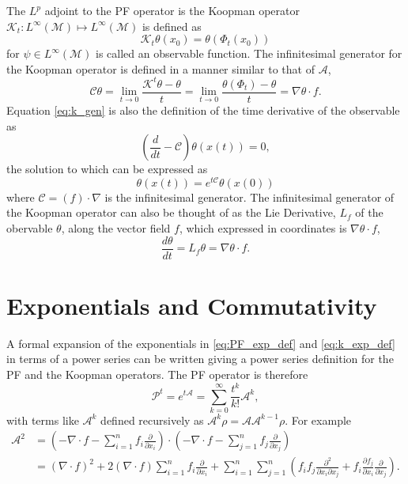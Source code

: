 \documentclass[pdflatex,sn-mathphys]{sn-jnl}%
\newcommand{\C}{\mathcal{C}}
\theoremstyle{thmstyleone}%
\theoremstyle{thmstyletwo}%
\theoremstyle{thmstylethree}%
\begin{document}
The $L^p$ adjoint to the PF operator is the Koopman operator   $\mathcal{K}_t : L^{\infty}(\mathcal{M}) \mapsto L^{\infty}(\mathcal{M})$ is defined as 
\begin{equation} \label{eq:koopman}
    \mathcal{K}_t \theta(x_0) = \theta(\Phi_t(x_0))
\end{equation}
for $\psi \in L^{\infty}(\mathcal{M})$ is called an observable function.
The infinitesimal generator for the Koopman operator is defined in a manner similar to that of $\mathcal{A}$,
\begin{equation}\label{eq:k_gen}
    \mathcal{C} \theta = \lim_{t \to 0}\frac{\mathcal{K}^t\theta - \theta}{t} = \lim_{t \to 0}\frac{\theta(\Phi_t)-\theta}{t} = \nabla \theta \cdot f.
\end{equation} 
Equation \eqref{eq:k_gen} is also the definition of the time derivative of the observable as
\begin{equation}\label{eq:k_pde}
\left(\frac{d}{dt} -\mathcal{C} \right) \theta(x(t)) = 0,
\end{equation}
the solution to which can be expressed as 
\begin{equation}\label{eq:k_exp_def}
    \theta(x(t)) = e^{t\mathcal{C}}\theta(x(0))
\end{equation}
where $\C = (f)\cdot\nabla$ is the infinitesimal generator. The infinitesimal generator of the Koopman operator can also be thought of as the Lie Derivative, $L_f$ of the obervable $\theta$, along the vector field $f$, which expressed in coordinates is $\nabla \theta \cdot f$,
\[
\frac{d \theta}{d t} = L_f \theta = \nabla \theta \cdot f.
\]


\section{Exponentials and Commutativity} \label{sec:exponentials}
A formal expansion of the exponentials in \eqref{eq:PF_exp_def} and \eqref{eq:k_exp_def} in terms of a power series  can be written giving  a power series definition for the PF and the Koopman operators. The PF operator is therefore
\begin{equation}\label{eq:Pf-exp}
\mathcal{P}^t = e^{t\mathcal{A}}= \sum_{k=0}^{\infty} \frac{t^k}{k!}\mathcal{A}^k,
\end{equation}
with terms like $\mathcal{A}^k$ defined recursively as $\mathcal{A}^k \rho = \mathcal{A} \mathcal{A}^{k-1} \rho$. For example
\[
\begin{split}
\mathcal{A}^2 &= (-\nabla \cdot f -\sum_{i=1}^n f_i\frac{\partial}{\partial x_i})\cdot(-\nabla \cdot f -\sum_{j=1}^n f_j\frac{\partial}{\partial x_j})\\
&=(\nabla \cdot f)^2 + 2(\nabla \cdot f)\sum_{i=1}^n f_i\frac{\partial}{\partial x_i}  + \sum_{i=1}^n\sum_{j=1}^n\left(f_if_j \frac{\partial^2}{\partial x_i \partial x_j} +  f_i \frac{\partial f_j}{\partial x_i}\frac{\partial }{\partial x_j}\right).
\end{split}
\]
\end{document}
